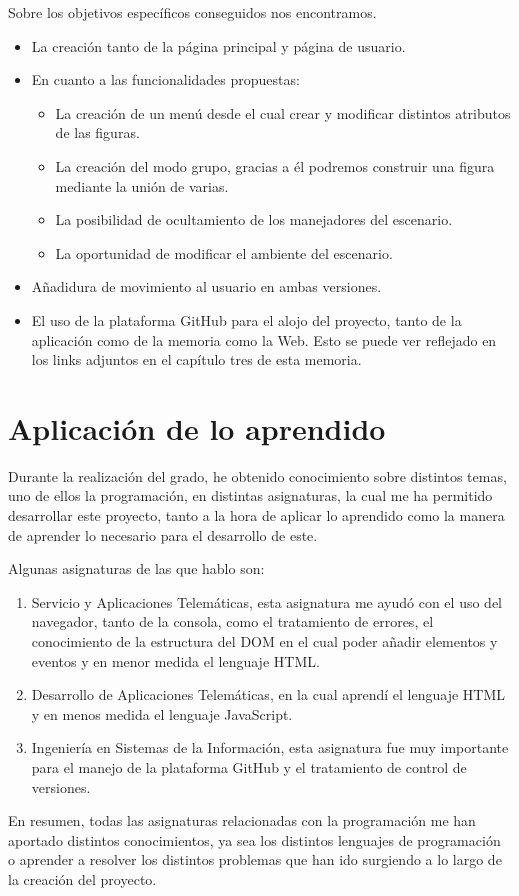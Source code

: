 \documentclass[a4paper, 12pt]{book}
\begin{document}
Sobre los objetivos específicos conseguidos nos encontramos. 
\begin{itemize}
    \item La creación tanto de la página principal y página de usuario.
    \item En cuanto a las funcionalidades propuestas:
    \begin{itemize}
        \item La creación de un menú desde el cual crear y modificar distintos atributos de las figuras.
        \item La creación del modo grupo, gracias a él podremos construir una figura mediante la unión de varias.
        \item La posibilidad de ocultamiento de los manejadores del escenario.
        \item La oportunidad de modificar el ambiente del escenario.
    \end{itemize}
    \item Añadidura de movimiento al usuario en ambas versiones.
    \item El uso de la plataforma GitHub para el alojo del proyecto, tanto de la aplicación como de la memoria como la Web. Esto se puede ver reflejado en los links adjuntos en el capítulo tres de esta memoria.
\end{itemize}

\section{Aplicación de lo aprendido}
\label{sec:aplicacion}

Durante la realización del grado, he obtenido conocimiento sobre distintos temas, uno de ellos la programación, en distintas asignaturas, la cual me ha permitido desarrollar este proyecto, tanto a la hora de aplicar lo aprendido como la manera de aprender lo necesario para el desarrollo de este.

Algunas asignaturas de las que hablo son:
\begin{enumerate}  
\item Servicio y Aplicaciones Telemáticas, esta asignatura me ayudó con el uso del navegador, tanto de la consola, como el tratamiento de errores, el conocimiento de la estructura del DOM en el cual poder añadir elementos y eventos y en menor medida el lenguaje HTML.
  \item Desarrollo de Aplicaciones Telemáticas, en la cual aprendí el lenguaje HTML y en menos medida el lenguaje JavaScript.
  \item Ingeniería en Sistemas de la Información, esta asignatura fue muy importante para el manejo de la plataforma GitHub y el tratamiento de control de versiones.
\end{enumerate}
En resumen, todas las asignaturas relacionadas con la programación me han aportado distintos conocimientos, ya sea los distintos lenguajes de programación o aprender a resolver los distintos problemas que han ido surgiendo a lo largo de la creación del proyecto.
\end{document}
